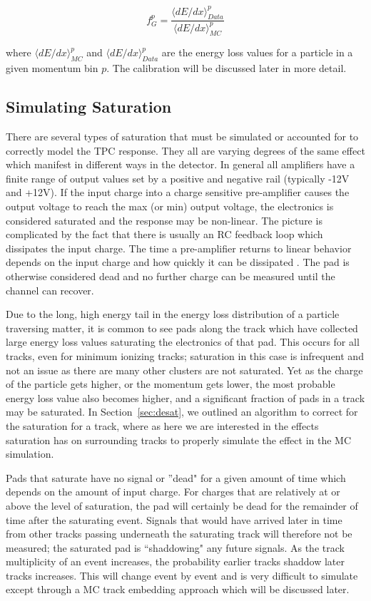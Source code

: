\begin{equation}
f_G^p = \frac{\langle dE/dx\rangle_{Data}^p}{\langle dE/dx\rangle_{MC}^p}
\label{eq:dedxcalibration}
\end{equation}

where $\langle dE/dx\rangle_{MC}^p$ and $\langle dE/dx\rangle_{Data}^p$  are the energy loss values for a particle in a given momentum bin $p$. The calibration will be discussed later in more detail. 

\subsection{Simulating Saturation}
\label{sec:simSat}

There are several types of saturation that must be simulated or accounted for to correctly model the TPC response. They all are varying degrees of the same effect which manifest in different ways in the detector. In general all amplifiers have a finite range of output values set by a positive and negative rail (typically -12V and +12V). If the input charge into a charge sensitive pre-amplifier causes the output voltage to reach the max (or min) output voltage, the electronics is considered saturated and the response may be non-linear. The picture is complicated by the fact that there is usually an RC feedback loop which dissipates the input charge. The time a pre-amplifier returns to linear behavior depends on the input charge and how quickly it can be dissipated \cite{akiGET}. The pad is otherwise considered dead and no further charge can be measured until the channel can recover. 
 
Due to the long, high energy tail in  the energy loss distribution of a particle traversing matter, it is common to see pads along the track which have collected large energy loss values saturating the electronics of that pad. This occurs for all tracks, even for minimum ionizing tracks; saturation in this case is infrequent and not an issue as there are many other clusters are not saturated. Yet as the charge of the particle gets higher, or the momentum gets lower, the most probable energy loss value also becomes higher, and a significant fraction of pads in a track may be saturated. In Section~\ref{sec:desat}, we outlined an algorithm to correct for the saturation for a track, where as here we are interested in the effects saturation has on surrounding tracks to properly simulate the effect in the MC simulation.

Pads that saturate have no signal or ''dead" for a given amount of time which depends on the amount of input charge. For charges that are relatively at or above the level of saturation, the pad will certainly be dead for the remainder of time after the saturating event. Signals that would have arrived later in time from other tracks passing underneath the saturating track will therefore not be measured; the saturated pad is ``shaddowing" any future signals. As the track multiplicity of an event increases, the probability earlier tracks shaddow later tracks increases. This will change event by event and is very difficult to simulate except through a MC track embedding approach which will be discussed later. 

